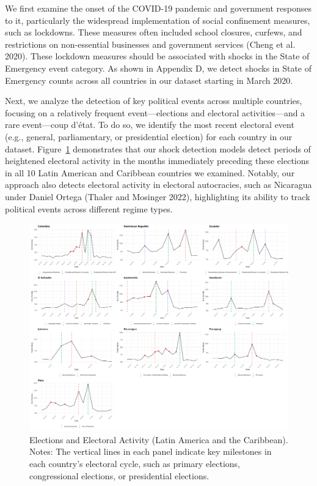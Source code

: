 \documentclass[
  letterpaper,
  DIV=11,
  numbers=noendperiod]{scrartcl}
\begin{document}
We first examine the onset of the COVID-19 pandemic and government
responses to it, particularly the widespread implementation of social
confinement measures, such as lockdowns. These measures often included
school closures, curfews, and restrictions on non-essential businesses
and government services (Cheng et al. 2020). These lockdown measures
should be associated with shocks in the State of Emergency event
category. As shown in Appendix D, we detect shocks in State of Emergency
counts across all countries in our dataset starting in March 2020.

Next, we analyze the detection of key political events across multiple
countries, focusing on a relatively frequent event---elections and
electoral activities---and a rare event---coup d'état. To do so, we
identify the most recent electoral event (e.g., general, parliamentary,
or presidential election) for each country in our dataset.
Figure~\ref{fig-elections_lac} demonstrates that our shock detection
models detect periods of heightened electoral activity in the months
immediately preceding these elections in all 10 Latin American and
Caribbean countries we examined. Notably, our approach also detects
electoral activity in electoral autocracies, such as Nicaragua under
Daniel Ortega (Thaler and Mosinger 2022), highlighting its ability to
track political events across different regime types.

\begin{figure}

{\centering \includegraphics{event_validation/Combined_elections_LAC.png}

}

\caption{\label{fig-elections_lac}Elections and Electoral Activity
(Latin America and the Caribbean). Notes: The vertical lines in each
panel indicate key milestones in each country's electoral cycle, such as
primary elections, congressional elections, or presidential elections.}

\end{figure}
\end{document}
